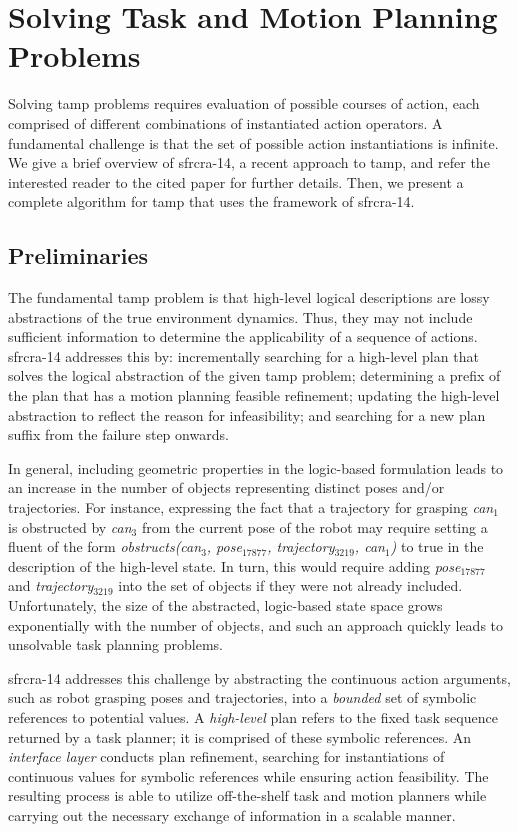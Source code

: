 \section{Solving Task and Motion Planning Problems}
Solving {\sc tamp} problems requires evaluation of possible courses of
action, each comprised of different combinations of instantiated
action operators. A fundamental challenge is that the set of possible
action instantiations is infinite.  We give a brief overview of {\sc
  sfrcra-14}, a recent approach to {\sc tamp}, and refer the
interested reader to the cited paper for further details.  Then, we
present a complete algorithm for {\sc tamp} that uses the framework of
{\sc sfrcra-14}.

\subsection{Preliminaries}
The fundamental {\sc tamp} problem is that high-level logical
descriptions are lossy abstractions of the true environment
dynamics. Thus, they may not include sufficient information to
determine the applicability of a sequence of actions.  {\sc sfrcra-14}
addresses this by: incrementally searching for a high-level plan that
solves the logical abstraction of the given {\sc tamp} problem;
determining a prefix of the plan that has a motion planning feasible
refinement; updating the high-level abstraction to reflect the reason
for infeasibility; and searching for a new plan suffix from the
failure step onwards.

In general, including geometric properties in the logic-based
formulation leads to an increase in the number of objects representing
distinct poses and/or trajectories. For instance, expressing the fact
that a trajectory for grasping \emph{can$_1$} is obstructed by
\emph{can$_3$} from the current pose of the robot may require
setting a fluent of the form \emph{obstructs(can$_3$, pose$_{17877}$,
  trajectory$_{3219}$, can$_1$)} to true in the description of the
high-level state. In turn, this would require adding
\emph{pose$_{17877}$} and \emph{trajectory$_{3219}$} into the set of
objects if they were not already included. Unfortunately, the size of
the abstracted, logic-based state space grows exponentially with the
number of objects, and such an approach quickly leads to unsolvable
task planning problems.

{\sc sfrcra-14} addresses this challenge by abstracting the continuous
action arguments, such as robot grasping poses and trajectories, into
a \emph{bounded} set of symbolic references to potential values. A
\emph{high-level} plan refers to the fixed task
sequence returned by a task planner; it is comprised of these symbolic
references. An \emph{interface layer} conducts plan refinement,
searching for instantiations of continuous values for symbolic
references while ensuring action feasibility.  The resulting process
is able to utilize off-the-shelf task and motion planners while
carrying out the necessary exchange of information in a scalable
manner.

